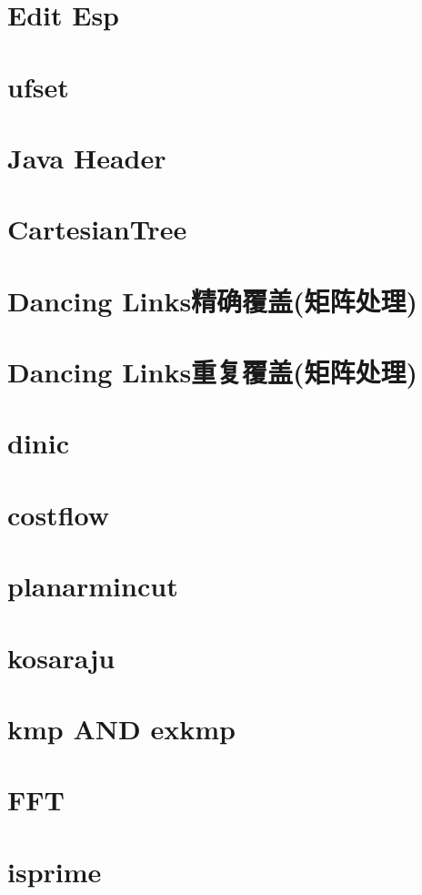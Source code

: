 \documentclass[
	10pt,
	twocolumn,
	a4paper,
]{article}
\begin{document}
\section{Edit Esp}

\section{ufset}

\section{Java Header}

\section{CartesianTree}

\section{Dancing Links精确覆盖(矩阵处理)}

\section{Dancing Links重复覆盖(矩阵处理)}

\section{dinic}

\section{costflow}

\section{planarmincut}

\section{kosaraju}

\section{kmp AND exkmp}

\section{FFT}

\section{isprime}

\end{document}
